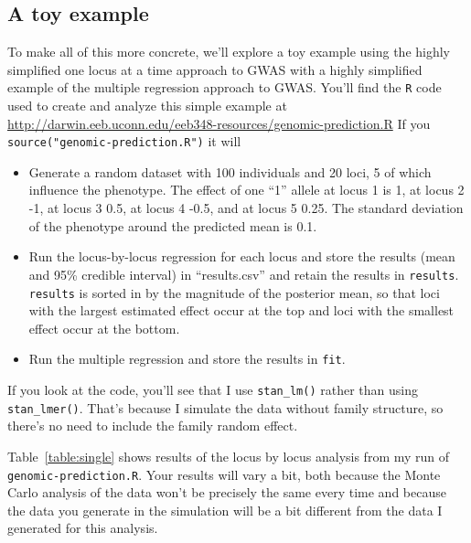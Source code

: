 \subsection*{A toy example}

To make all of this more concrete, we'll explore a toy example using
the highly simplified one locus at a time approach to GWAS with a
highly simplified example of the multiple regression approach to
GWAS. You'll find the {\tt R} code used to create and analyze this
simple example at
\url{http://darwin.eeb.uconn.edu/eeb348-resources/genomic-prediction.R}
If you {\tt source("genomic-prediction.R")} it will

\begin{itemize}

\item Generate a random dataset with 100 individuals and 20 loci, 5 of
  which influence the phenotype. The effect of one ``1'' allele at
  locus 1 is 1, at locus 2 -1, at locus 3 0.5, at locus 4 -0.5, and at
  locus 5 0.25. The standard deviation of the phenotype around the
  predicted mean is 0.1.

\item Run the locus-by-locus regression for each locus and store the
  results (mean and 95\% credible interval) in ``results.csv'' and
  retain the results in {\tt results}. {\tt results} is sorted in by
  the magnitude of the posterior mean, so that loci with the largest
  estimated effect occur at the top and loci with the smallest effect
  occur at the bottom.

\item Run the multiple regression and store the results in {\tt fit}. 
    
\end{itemize}

If you look at the code, you'll see that I use {\tt stan\_lm()} rather
than using {\tt stan\_lmer()}. That's because I simulate the data without
family structure, so there's no need to include the family random
effect.

Table~\ref{table:single} shows results of the locus by locus analysis
from my run of {\tt genomic-prediction.R}. Your results will vary a
bit, both because the Monte Carlo analysis of the data won't be
precisely the same every time and because the data you generate in the
simulation will be a bit different from the data I generated for this
analysis.

